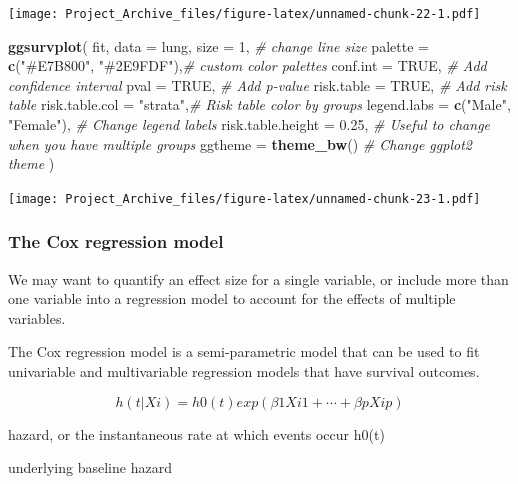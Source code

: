 \documentclass[
]{book}
\newenvironment{Shaded}{\begin{snugshade}}{\end{snugshade}}
\newcommand{\AttributeTok}[1]{\textcolor[rgb]{0.13,0.29,0.53}{#1}}
\newcommand{\CommentTok}[1]{\textcolor[rgb]{0.56,0.35,0.01}{\textit{#1}}}
\newcommand{\ConstantTok}[1]{\textcolor[rgb]{0.56,0.35,0.01}{#1}}
\newcommand{\DecValTok}[1]{\textcolor[rgb]{0.00,0.00,0.81}{#1}}
\newcommand{\FloatTok}[1]{\textcolor[rgb]{0.00,0.00,0.81}{#1}}
\newcommand{\FunctionTok}[1]{\textcolor[rgb]{0.13,0.29,0.53}{\textbf{#1}}}
\newcommand{\NormalTok}[1]{#1}
\newcommand{\StringTok}[1]{\textcolor[rgb]{0.31,0.60,0.02}{#1}}
\providecommand{\tightlist}{%
  \setlength{\itemsep}{0pt}\setlength{\parskip}{0pt}}
\begin{document}
\texttt{[image: Project\_Archive\_files/figure-latex/unnamed-chunk-22-1.pdf]}

\begin{Shaded}
\begin{Highlighting}[]
\FunctionTok{ggsurvplot}\NormalTok{(}
\NormalTok{  fit,}
  \AttributeTok{data =}\NormalTok{ lung,}
  \AttributeTok{size =} \DecValTok{1}\NormalTok{,                 }\CommentTok{\# change line size}
  \AttributeTok{palette =}
    \FunctionTok{c}\NormalTok{(}\StringTok{"\#E7B800"}\NormalTok{, }\StringTok{"\#2E9FDF"}\NormalTok{),}\CommentTok{\# custom color palettes}
  \AttributeTok{conf.int =} \ConstantTok{TRUE}\NormalTok{,          }\CommentTok{\# Add confidence interval}
  \AttributeTok{pval =} \ConstantTok{TRUE}\NormalTok{,              }\CommentTok{\# Add p{-}value}
  \AttributeTok{risk.table =} \ConstantTok{TRUE}\NormalTok{,        }\CommentTok{\# Add risk table}
  \AttributeTok{risk.table.col =} \StringTok{"strata"}\NormalTok{,}\CommentTok{\# Risk table color by groups}
  \AttributeTok{legend.labs =}
    \FunctionTok{c}\NormalTok{(}\StringTok{"Male"}\NormalTok{, }\StringTok{"Female"}\NormalTok{),    }\CommentTok{\# Change legend labels}
  \AttributeTok{risk.table.height =} \FloatTok{0.25}\NormalTok{, }\CommentTok{\# Useful to change when you have multiple groups}
  \AttributeTok{ggtheme =} \FunctionTok{theme\_bw}\NormalTok{()      }\CommentTok{\# Change ggplot2 theme}
\NormalTok{)}
\end{Highlighting}
\end{Shaded}

\texttt{[image: Project\_Archive\_files/figure-latex/unnamed-chunk-23-1.pdf]}

\hypertarget{the-cox-regression-model}{%
\subsubsection{The Cox regression model}\label{the-cox-regression-model}}

We may want to quantify an effect size for a single variable, or include more than one variable into a regression model to account for the effects of multiple variables.

The Cox regression model is a semi-parametric model that can be used to fit univariable and multivariable regression models that have survival outcomes.

\[h(t|Xi)=h0(t)exp(β1Xi1+⋯+βpXip)\]

\begin{description}
\tightlist
\item[\(h(t)\)]
hazard, or the instantaneous rate at which events occur h0(t)

underlying baseline hazard
\end{description}
\end{document}
